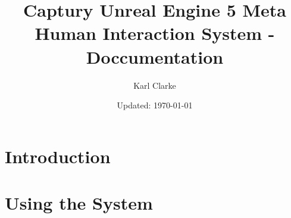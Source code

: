 \documentclass{report}
\title{Captury Unreal Engine 5 Meta Human Interaction System - Doccumentation}
\author{Karl Clarke}
\date{Updated: \today}
\begin{document}
\maketitle
\tableofcontents

\onehalfspacing %

\chapter{Introduction}


\chapter{Using the System}

\end{document}
